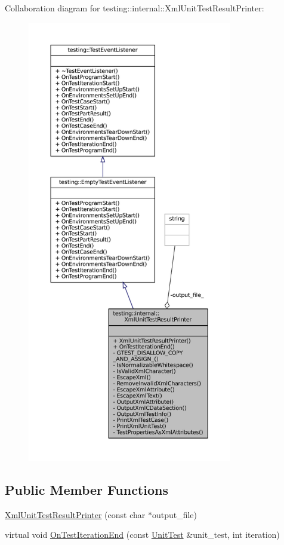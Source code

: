 Collaboration diagram for testing\+:\+:internal\+:\+:Xml\+Unit\+Test\+Result\+Printer\+:
\nopagebreak
\begin{figure}[H]
\begin{center}
\leavevmode
\includegraphics[height=550pt]{classtesting_1_1internal_1_1XmlUnitTestResultPrinter__coll__graph}
\end{center}
\end{figure}
\subsection*{Public Member Functions}
\begin{DoxyCompactItemize}
\item 
\hyperlink{classtesting_1_1internal_1_1XmlUnitTestResultPrinter_afdaf88e6764c18ce0dcc3733d7a06e31}{Xml\+Unit\+Test\+Result\+Printer} (const char $\ast$output\+\_\+file)
\item 
virtual void \hyperlink{classtesting_1_1internal_1_1XmlUnitTestResultPrinter_a2ae986dd2f4f2aed31cc6f3bc8c56898}{On\+Test\+Iteration\+End} (const \hyperlink{classtesting_1_1UnitTest}{Unit\+Test} \&unit\+\_\+test, int iteration)
\end{DoxyCompactItemize}
